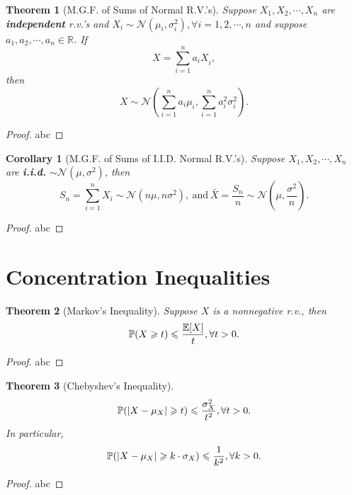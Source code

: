\documentclass[openany,12pt]{book}
\newtheorem{theorem}{Theorem}[chapter]
\newtheorem{corollary}{Corollary}[chapter]
\begin{document}
\begin{theorem}[M.G.F. of Sums of Normal R.V.'s]
  Suppose $X_{1}, X_{2}, \cdots,X_{n}$ are \textbf{independent} r.v.'s
  and $X_{i}\sim \mathcal{N}\left( \mu_{i}, \sigma_{i}^{2} \right), \forall i = 1,2, \cdots,n$
  and suppose $a_{1},a_{2}, \cdots,a_n\in\mathbb{R}$.
  If
  \[ X = \sum_{i = 1}^{n}{a_{i}X}_{i},\]
  then
  \[ X\sim \mathcal{N}\left( \sum_{i = 1}^{n}{a_{i}\mu_{i}},\sum_{i = 1}^{n}{a_{i}^{2}\sigma_{i}^{2}} \right).\]
\end{theorem}

\begin{proof}
  abc
\end{proof}

\begin{corollary}[M.G.F. of Sums of I.I.D. Normal R.V.'s]
  Suppose $X_{1}, X_{2}, \cdots,X_{n}$ are \textbf{i.i.d.}
  $\sim \mathcal{N}\left( \mu,\sigma^{2} \right)$, then
  \[S_{n} = \sum_{i = 1}^{n}X_{i}\sim \mathcal{N}\left( n\mu,n\sigma^{2} \right),~\text{and}~\bar{X} = \frac{S_{n}}{n}\sim \mathcal{N}\left( \mu,\frac{\sigma^{2}}{n} \right).\]
\end{corollary}

\begin{proof}
  abc
\end{proof}

\section{Concentration Inequalities}

\begin{theorem}[Markov's Inequality]
  Suppose $X$ is a nonnegative r.v., then
  \begin{equation}
    \mathbb{P}(X \geqslant t) \leqslant \frac{\mathbb{E}[X]}{t}, \forall t > 0.
  \end{equation}
\end{theorem}

\begin{proof}
  abc
\end{proof}

\begin{theorem}[Chebyshev's Inequality]
  \[\mathbb{P}( \left| X - \mu_{X} \right| \geqslant t) \leqslant \frac{\sigma_{X}^{2}}{t^{2}}, \forall t > 0.\]
  In particular,
  \[\mathbb{P}(\left| X - \mu_{X} \right| \geqslant k \cdot \sigma_{X}) \leqslant \frac{1}{k^{2}}, \forall k > 0.\]
\end{theorem}

\begin{proof}
  abc
\end{proof}
\end{document}
